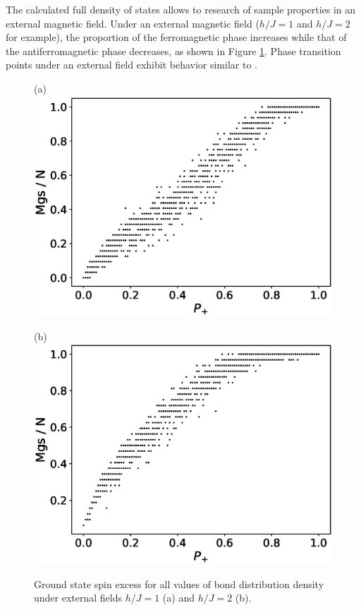 \documentclass[preprint,12pt]{elsarticle}
\begin{document}
	The calculated full density of states allows to research of sample properties in an external magnetic field. Under an external magnetic field ($h/J = 1$ and $h/J = 2$ for example), the proportion of the ferromagnetic phase increases while that of the antiferromagnetic phase decreases, as shown in Figure \ref{fig:Mgs(P+)_H}. Phase transition points under an external field exhibit behavior similar to \cite{trukhin2024thermodynamic}.
	
	\begin{figure}[H]
		\begin{minipage}[h]{0.45\linewidth}
			\centering (a)
			\includegraphics[width=1\linewidth]{images/Mgs(P+)_H1.eps}
		\end{minipage}
		\hfill
		\begin{minipage}[h]{0.45\linewidth}
			\centering (b)
			\includegraphics[width=1\linewidth]{images/Mgs(P+)_H2.eps}
		\end{minipage}
		\caption{Ground state spin excess for all values of bond distribution density under external fields $h/J = 1$ (a) and $h/J = 2$ (b).}
		\label{fig:Mgs(P+)_H}
	\end{figure}
	
\end{document}
